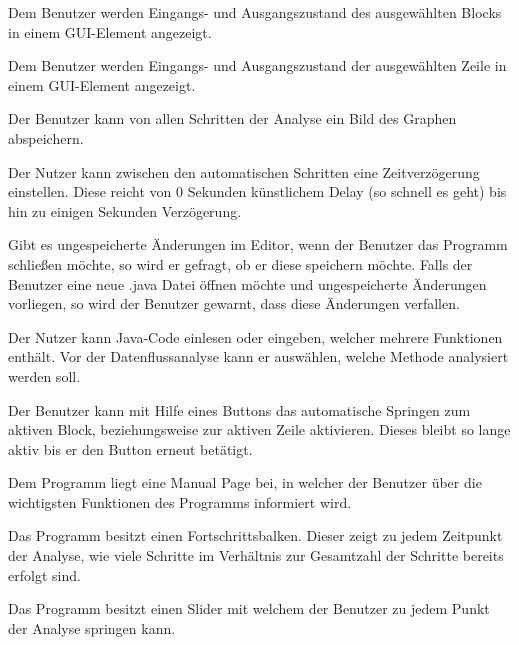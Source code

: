 Dem Benutzer werden Eingangs- und Ausgangszustand des ausgewählten Blocks in einem GUI-Element angezeigt.

Dem Benutzer werden Eingangs- und Ausgangszustand der ausgewählten Zeile in einem GUI-Element angezeigt.

Der Benutzer kann von allen Schritten der Analyse ein Bild des Graphen abspeichern.

Der Nutzer kann zwischen den automatischen Schritten eine Zeitverzögerung einstellen. Diese reicht von 0 Sekunden künstlichem Delay (so schnell es geht) bis hin zu einigen Sekunden Verzögerung.

Gibt es ungespeicherte Änderungen im Editor, wenn der Benutzer das Programm schließen möchte, so wird er gefragt, ob er diese speichern möchte.
Falls der Benutzer eine neue .java Datei öffnen möchte und ungespeicherte Änderungen vorliegen, so wird der Benutzer gewarnt, dass diese Änderungen verfallen.

Der Nutzer kann Java-Code einlesen oder eingeben, welcher mehrere Funktionen
enthält. Vor der Datenflussanalyse kann er auswählen, welche Methode
analysiert werden soll.

Der Benutzer kann mit Hilfe eines Buttons das automatische Springen zum aktiven Block, beziehungsweise zur aktiven Zeile aktivieren. Dieses bleibt so lange aktiv bis er den Button erneut betätigt.

Dem Programm liegt eine Manual Page bei, in welcher der Benutzer über die wichtigsten Funktionen des Programms informiert wird.

Das Programm besitzt einen Fortschrittsbalken. Dieser zeigt zu jedem Zeitpunkt der Analyse, wie viele Schritte im Verhältnis zur Gesamtzahl der Schritte bereits erfolgt sind.

Das Programm besitzt einen Slider mit welchem der Benutzer zu jedem Punkt der Analyse springen kann.